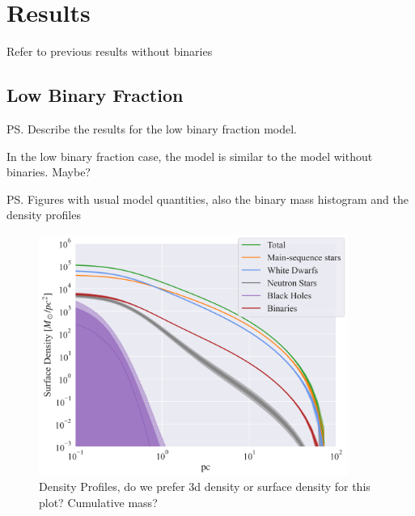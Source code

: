 


\section{Results}




Refer to previous results without binaries


\subsection{Low Binary Fraction}
\ps{Describe the results for the low binary fraction model.}

In the low binary fraction case, the model is similar to the model without binaries. Maybe?

\ps{Figures with usual model quantities, also the binary mass histogram and the density profiles}


\begin{figure}
	\begin{center}
		\includegraphics[width=0.9\textwidth]{figures/low_bin_model/surface_dens.png}
	\end{center}
	\caption{Density Profiles, do we prefer 3d density or surface density for this plot? Cumulative mass?}
	\label{fig:low_bin_model_densities}
\end{figure}


